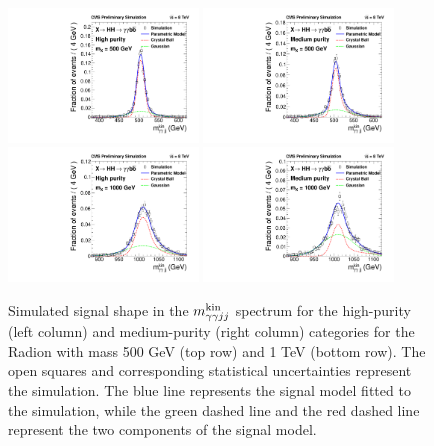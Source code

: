\begin{figure}[ht!]
 \begin{center}
   \includegraphics[width=0.45\textwidth]{figures/results/sigmodel_cat0_500GeV.pdf}
   \includegraphics[width=0.45\textwidth]{figures/results/sigmodel_cat1_500GeV.pdf}
   \includegraphics[width=0.45\textwidth]{figures/results/sigmodel_cat0_1000GeV.pdf}
   \includegraphics[width=0.45\textwidth]{figures/results/sigmodel_cat1_1000GeV.pdf}
 \end{center}
\caption{Simulated signal shape in the $m_{\gamma\gamma jj}^{\rm kin}$ spectrum for the high-purity (left column)
and medium-purity (right column) categories for the Radion with mass 500 GeV (top row) and
1 TeV (bottom row). The open squares and corresponding
statistical uncertainties represent the simulation.
The blue line represents the signal model fitted to the simulation, while the green dashed line
and the red dashed line represent the two components of the signal model.}
\label{fig:sigfit_500_1000}
\end{figure}


